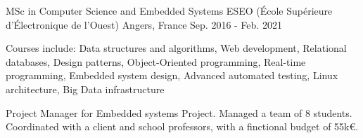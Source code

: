 

\begin{cventries}

  \cventry
    {MSc in Computer Science and Embedded Systems} %
    {ESEO (École Supérieure d'Électronique de l'Ouest)} %
    {Angers, France} %
    {Sep. 2016 - Feb. 2021} %
    {
      \begin{cvitems} %
        \item {Courses include: Data structures and algorithms, Web development, Relational databases, Design patterns, Object-Oriented programming, Real-time programming, Embedded system design, Advanced automated testing, Linux architecture, Big Data infrastructure}
        \item {Project Manager for Embedded systems Project. Managed a team of 8 students. Coordinated with a client and school professors, with a finctional budget of 55k€.}
      \end{cvitems}
    }

\end{cventries}
